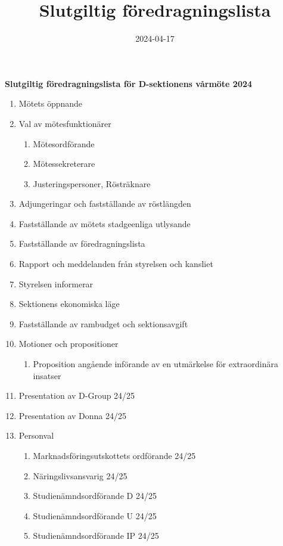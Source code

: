 \documentclass{datateknologsektionen-document}
\title{Slutgiltig föredragningslista}
\date{2024-04-17}
\begin{document}
\large
\begin{center}
  {\LARGE\bfseries Slutgiltig föredragningslista för D-sektionens vårmöte 2024}
  \vspace{2mm}
\end{center}

\Large
\begin{enumerate}[topsep=0pt,itemsep=1ex]
  \item Mötets öppnande
  \item Val av mötesfunktionärer
        \begin{enumerate}[label*=\arabic*.,leftmargin=3em]
          \item Mötesordförande
          \item Mötessekreterare
          \item Justeringspersoner, Rösträknare
        \end{enumerate}
  \item Adjungeringar och fastställande av röstlängden
  \item Fastställande av mötets stadgeenliga utlysande
  \item Fastställande av föredragningslista
  \item Rapport och meddelanden från styrelsen och kansliet
  \item Styrelsen informerar
  \item Sektionens ekonomiska läge
  \item Fastställande av rambudget och sektionsavgift
  \item Motioner och propositioner
        \begin{enumerate}[label*=\arabic*.,leftmargin=3em]
          \item Proposition angående införande av en utmärkelse för extraordinära insatser
        \end{enumerate}
  \item Presentation av D-Group 24/25
  \item Presentation av Donna 24/25
  \item Personval
        \begin{enumerate}[label*=\arabic*.,leftmargin=3em]
          \item Marknadsföringsutskottets ordförande 24/25
          \item Näringslivsansvarig 24/25
          \item Studienämndsordförande D 24/25
          \item Studienämndsordförande U 24/25
          \item Studienämndsordförande IP 24/25

\end{enumerate}
\end{enumerate}
\end{document}
